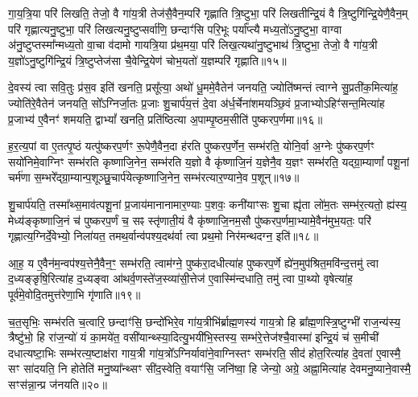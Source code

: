 गा॒य॒त्रि॒या परि॑ लिखति॒ तेजो॒ वै गा॑य॒त्री तेज॑सै॒वैन॒म्परि॑ गृह्णाति त्रि॒ष्टुभा॒ परि॑ लिखतीन्द्रि॒यं वै त्रि॒ष्टुगि॑न्द्रि॒येणै॒वैन॒म् परि॑ गृह्णात्यनु॒ष्टुभा॒ परि॑ लिखत्यनु॒ष्टुप्सर्वा॑णि॒ छन्दाꣳ॑सि परि॒भूः पर्या᳚प्त्यै मध्य॒तो॑\-ऽनु॒ष्टुभा॒ वाग्वा अ॑नु॒ष्टुप्तस्मा᳚न्मध्य॒तो वा॒चा व॑दामो गायत्रि॒या प्र॑थ॒मया॒ परि॑ लिख॒त्यथा॑नु॒ष्टुभाथ॑ त्रि॒ष्टुभा॒ तेजो॒ वै गा॑य॒त्री य॒ज्ञो॑\-ऽनु॒ष्टुगि॑न्द्रि॒यं त्रि॒ष्टुप्तेज॑सा चै॒वेन्द्रि॒येण॑ चोभ॒यतो॑ य॒ज्ञम्परि॑ गृह्णाति॥१५॥

{\anuvakamend[{अ॒न्धो᳚\-ऽध्व॒र्युर्म॒हान्भ॑वति त्रि॒ष्टुभा॒ तेजो॒ वै गा॑य॒त्री त्रयो॑दश च॥३॥}]}

दे॒वस्य॑ त्वा सवि॒तुः प्र॑स॒व इति॑ खनति॒ प्रसू᳚त्या॒ अथो॑ धू॒ममे॒वैतेन॑ जनयति॒ ज्योति॑ष्मन्तं त्वाग्ने सु॒प्रती॑क॒मित्या॑ह॒ ज्योति॑रे॒वैतेन॑ जनयति॒ सो᳚\-ऽग्निर्जा॒तः प्र॒जाः शु॒चार्प॑य॒त्तं दे॒वा अ॑र्ध॒र्चेना॑शमयञ्छि॒वं प्र॒जाभ्यो\-ऽहिꣳ॑सन्त॒मित्या॑ह प्र॒जाभ्य॑ ए॒वैनꣳ॑ शमयति॒ द्वा\-भ्यां᳚ खनति॒ प्रति॑ष्ठित्या अ॒पाम्पृ॒ष्ठम॒सीति॑ पुष्करप॒र्णमा॥१६॥

ह॒र॒त्य॒पां वा ए॒तत्पृ॒ष्ठं यत्पु॑ष्करप॒र्णꣳ रू॒पेणै॒वैन॒दा ह॑रति पुष्करप॒र्णेन॒ सम्भ॑रति॒ योनि॒र्वा अ॒ग्नेः पु॑ष्करप॒र्णꣳ सयो॑निमे॒वाग्निꣳ सम्भ॑रति कृष्णाजि॒नेन॒ सम्भ॑रति य॒ज्ञो वै कृ॑ष्णाजि॒नं य॒ज्ञेनै॒व य॒ज्ञꣳ सम्भ॑रति॒ यद्ग्रा॒म्याणां᳚ पशू॒नां चर्म॑णा स॒म्भरे᳚द्ग्रा॒म्यान्प॒शूञ्छु॒चार्प॑येत्कृष्णाजि॒नेन॒ सम्भ॑रत्यार॒ण्याने॒व प॒शून्॥१७॥

शु॒चार्प॑यति॒ तस्मा᳚थ्स॒माव॑त्पशू॒नां प्र॒जाय॑मानानामार॒ण्याः प॒शवः॒ कनी॑याꣳसः शु॒चा ह्यृ॑ता लो॑म॒तः सम्भ॑र॒त्यतो॒ ह्य॑स्य॒ मेध्य॑ङ्कृष्णाजि॒नं च॑ पुष्करप॒र्णं च॒ सꣴ स्तृ॑णाती॒यं वै कृ॑ष्णाजि॒नम॒सौ पु॑ष्करप॒र्णमा॒भ्यामे॒वैन॑मुभ॒यतः॒ परि॑ गृह्णात्य॒ग्निर्दे॒वेभ्यो॒ निला॑यत॒ तमथ॒र्वान्व॑पश्य॒दथ॑र्वा त्वा प्रथ॒मो निर॑मन्थदग्न॒ इति॑॥१८॥

आ॒ह॒ य ए॒वैन॑म॒न्वप॑श्य॒त्तेनै॒वैन॒ꣳ॒ सम्भ॑रति॒ त्वाम॑ग्ने॒ पुष्क॑रा॒दधीत्या॑ह पुष्करप॒र्णे ह्ये॑न॒मुप॑श्रित॒मवि॑न्द॒त्तमु॑ त्वा द॒ध्यङ्ङृषि॒रित्या॑ह द॒ध्यङ्वा आ॑थर्व॒णस्ते॑ज॒स्व्या॑सी॒त्तेज॑ ए॒वास्मि॑न्दधाति॒ तमु॑ त्वा पा॒थ्यो वृषेत्या॑ह॒ पूर्व॑मे॒वोदि॒तमुत्त॑रेणा॒भि गृ॑णाति॥१९॥

च॒त॒सृभिः॒ सम्भ॑रति च॒त्वारि॒ छन्दाꣳ॑सि॒ छन्दो॑भिरे॒व गा॑य॒त्रीभि॑र्ब्राह्म॒णस्य॑ गाय॒त्रो हि ब्रा᳚ह्म॒णस्त्रि॒॒ष्टुग्भी॑ राज॒न्य॑स्य॒ त्रैष्टु॑भो॒ हि रा॑ज॒न्यो॑ यं का॒मये॑त॒ वसी॑यान्थ्स्या॒दित्यु॒भयी॑भि॒स्तस्य॒ सम्भ॑रे॒त्तेज॑श्चै॒वास्मा॑ इन्द्रि॒यं च॑ स॒मीची॑ दधात्यष्टा॒भिः सम्भ॑रत्य॒ष्टाक्ष॑रा गाय॒त्री गा॑य॒त्रो᳚\-ऽग्निर्यावा॑ने॒वाग्निस्तꣳ सम्भ॑रति॒ सीद॑ होत॒रित्या॑ह दे॒वता॑ ए॒वास्मै॒ सꣳ सा॑दयति॒ नि होतेति॑ मनु॒ष्या᳚न्थ्सꣳ सी॑द॒स्वेति॒ वयाꣳ॑सि॒ जनि॑ष्वा॒ हि जेन्यो॒ अग्रे॒ अह्ना॒मित्या॑ह देवमनु॒ष्याने॒वास्मै॒ सꣳस॑न्ना॒न्प्र ज॑नयति॥२०॥

